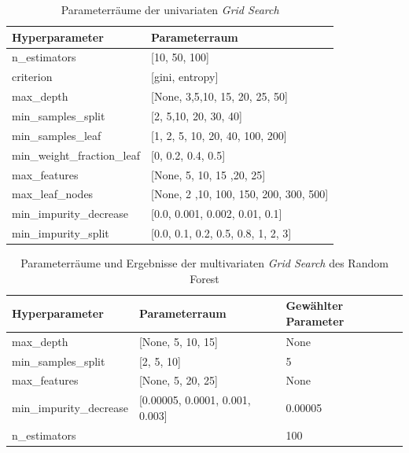\begin{table}[H]
	\centering
	\begin{tabular}{ll}
		\hline
		Hyperparameter              & Parameterraum                              \\ \hline
		n\_estimators               & {[}10, 50, 100{]}                          \\
		criterion                   & {[}gini, entropy{]}                    \\
		max\_depth                  & {[}None, 3,5,10, 15, 20, 25, 50{]}         \\
		min\_samples\_split         & {[}2, 5,10, 20, 30, 40{]}                  \\
		min\_samples\_leaf          & {[}1, 2, 5, 10, 20, 40, 100, 200{]}                  \\
		min\_weight\_fraction\_leaf & {[}0, 0.2, 0.4, 0.5{]}                     \\
		max\_features               & {[}None, 5, 10, 15 ,20, 25{]}              \\
		max\_leaf\_nodes            & {[}None, 2 ,10, 100, 150, 200, 300, 500{]} \\
		min\_impurity\_decrease     & {[}0.0, 0.001, 0.002, 0.01, 0.1{]}     \\
		min\_impurity\_split        & {[}0.0, 0.1, 0.2, 0.5, 0.8, 1, 2, 3{]}     \\ \hline
	\end{tabular}
	\caption{\label{table:parameter_grid_univariat} Parameterräume der univariaten \emph{Grid Search}}
\end{table}

\begin{table}[H]
	\centering
	\begin{tabular}{lll}
		\hline
		Hyperparameter          & Parameterraum                       & Gewählter Parameter \\ \hline
		max\_depth              & {[}None, 5, 10, 15{]}               & None                \\
		min\_samples\_split     & {[}2, 5, 10{]}                      & 5                   \\
		max\_features           & {[}None, 5, 20, 25{]}               & None                \\
		min\_impurity\_decrease & {[}0.00005, 0.0001, 0.001, 0.003{]} & 0.00005             \\ 
		n\_estimators &  & 100 \\ \hline
	\end{tabular}
	\caption{\label{table:parameter_grid_multivariat_forest} Parameterräume und Ergebnisse der multivariaten \emph{Grid Search} des Random Forest}
\end{table}


